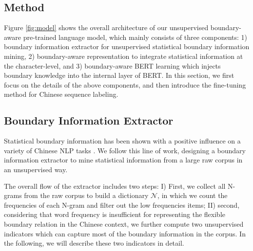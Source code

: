 \documentclass[11pt]{article}
\begin{document}
\begin{CJK}{UTF8}{gbsn}
\section{Method}
Figure \ref{fig:model} shows the overall architecture of our unsupervised boundary-aware pre-trained language model,
which mainly consists of three components:
1) boundary information extractor for unsupervised statistical boundary information mining,
2) boundary-aware representation to integrate statistical information at the character-level,
and 3) boundary-aware BERT learning which injects boundary knowledge into the internal layer of BERT.
In this section, we first focus on the details of the above components,
and then introduce the fine-tuning method for Chinese sequence labeling.

\subsection{Boundary Information Extractor}
\label{sec:unsper-bound-ext}
Statistical boundary information has been shown with a positive influence on a variety of Chinese NLP tasks \cite{Song12usinga, higashiyama-etal-2019-incorporating, ding-etal-2020-coupling, xiao-etal-2021-ernie}.
We follow this line of work, designing a boundary information extractor to mine statistical information from a large raw corpus in an unsupervised way.


The overall flow of the extractor includes two steps:
I) First, we collect all N-grams from the raw corpus to build a dictionary $\mathcal{N}$,
in which we count the frequencies of each N-gram and filter out the low frequencies items; II) second, considering that word frequency is insufficient for representing the flexible boundary relation in the Chinese context,
we further compute two unsupervised indicators which can capture most of the boundary information in the corpus.
In the following, we will describe these two indicators in detail.









\end{CJK}
\end{document}
